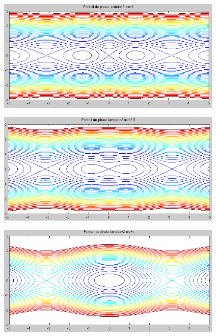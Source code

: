 \documentclass[11pt]{article}
\begin{document}
\begin{figure}[h!]
	\centering
	\includegraphics[scale=0.65]{Figures/rapport_pp20.png}
\end{figure}

\begin{figure}[h!]
	\centering
	\includegraphics[scale=0.66]{Figures/rapport_pp25.png}
\end{figure}

\begin{figure}[h!]
	\centering
	\includegraphics[scale=0.65]{Figures/rapport_pp40.png}
\end{figure}
\end{document}
